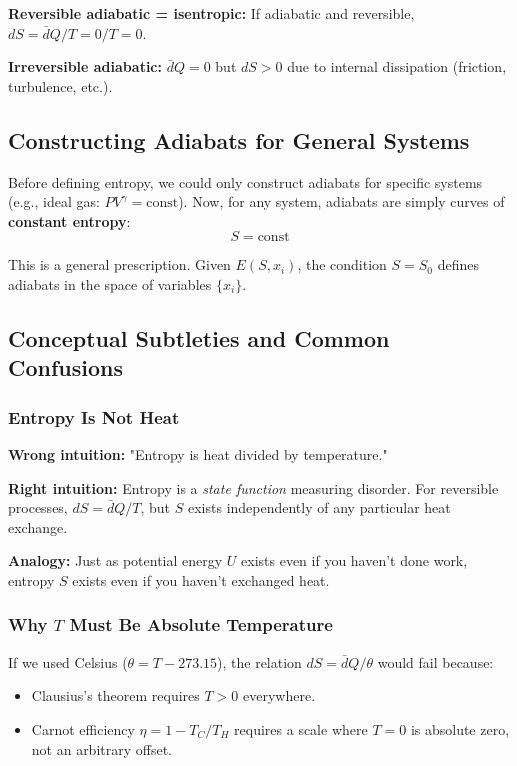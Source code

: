 \documentclass[9pt,twocoloumn]{article}
\begin{document}
\textbf{Reversible adiabatic = isentropic:} If adiabatic and reversible, $dS = \bar{d}Q/T = 0/T = 0$.

\textbf{Irreversible adiabatic:} $\bar{d}Q = 0$ but $dS > 0$ due to internal dissipation (friction, turbulence, etc.).

\subsection{Constructing Adiabats for General Systems}

Before defining entropy, we could only construct adiabats for specific systems (e.g., ideal gas: $PV^{\gamma} = \text{const}$). Now, for any system, adiabats are simply curves of \textbf{constant entropy}:
\begin{equation}
S = \text{const}
\end{equation}

This is a general prescription. Given $E(S, x_i)$, the condition $S = S_0$ defines adiabats in the space of variables $\{x_i\}$.

\subsection{Conceptual Subtleties and Common Confusions}

\subsubsection{Entropy Is Not Heat}

\textbf{Wrong intuition:} "Entropy is heat divided by temperature."

\textbf{Right intuition:} Entropy is a \emph{state function} measuring disorder. For reversible processes, $dS = \bar{d}Q/T$, but $S$ exists independently of any particular heat exchange.

\textbf{Analogy:} Just as potential energy $U$ exists even if you haven't done work, entropy $S$ exists even if you haven't exchanged heat.

\subsubsection{Why $T$ Must Be Absolute Temperature}

If we used Celsius ($\theta = T - 273.15$), the relation $dS = \bar{d}Q/\theta$ would fail because:
\begin{itemize}
    \item Clausius's theorem requires $T > 0$ everywhere.
    \item Carnot efficiency $\eta = 1 - T_C/T_H$ requires a scale where $T = 0$ is absolute zero, not an arbitrary offset.
\end{itemize}
\end{document}
